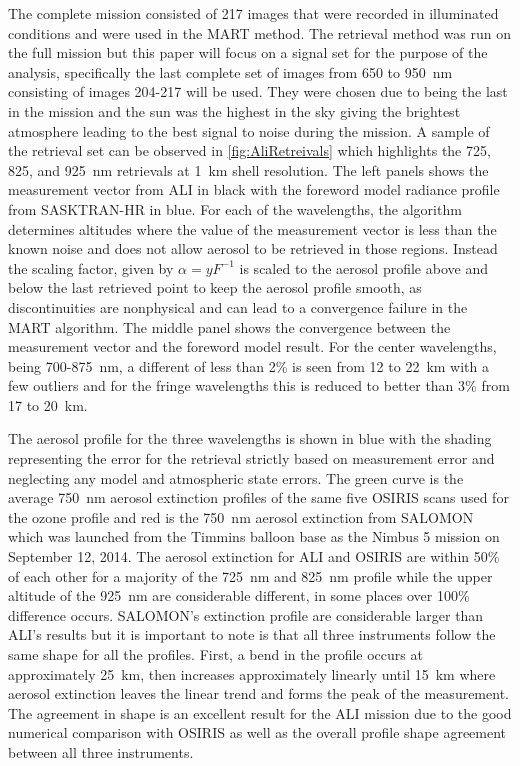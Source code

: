 \documentclass[12pt]{article}
\begin{document}
The complete mission consisted of 217 images that were recorded in illuminated conditions and were used in the MART method. The retrieval method was run on the full mission but this paper will focus on a signal set for the purpose of the analysis, specifically the last complete set of images from 650 to 950~nm consisting of images 204-217 will be used. They were chosen due to being the last in the mission and the sun was the highest in the sky giving the brightest atmosphere leading to the best signal to noise during the mission. A sample of the retrieval set can be observed in \autoref{fig:AliRetreivals} which highlights the 725, 825, and 925~nm retrievals at 1~km shell resolution. The left panels shows the measurement vector from ALI in black with the foreword model radiance profile from SASKTRAN-HR in blue. For each of the wavelengths, the algorithm determines altitudes where the value of the measurement vector is less than the known noise and does not allow aerosol to be retrieved in those regions. Instead the scaling factor, given by $\alpha = yF^{-1}$ is scaled to the aerosol profile above and below the last retrieved point to keep the aerosol profile smooth, as discontinuities are nonphysical and can lead to a convergence failure in the MART algorithm. The middle panel shows the convergence between the measurement vector and the foreword model result. For the center wavelengths, being 700-875~nm, a different of less than 2\% is seen from 12 to 22~km with a few outliers and for the fringe wavelengths this is reduced to better than 3\% from 17 to 20~km.

The aerosol profile for the three wavelengths is shown in blue with the shading representing the error for the retrieval strictly based on measurement error and neglecting any model and atmospheric state errors. The green curve is the average 750~nm aerosol extinction profiles of the same five OSIRIS scans used for the ozone profile and red is the 750~nm aerosol extinction from SALOMON \citep{Berthet2002} which was launched from the Timmins balloon base as the Nimbus 5 mission on September 12, 2014. The aerosol extinction for ALI and OSIRIS are within 50\% of each other for a majority of the 725~nm and 825~nm profile while the upper altitude of the 925~nm are considerable different, in some places over 100\% difference occurs. SALOMON's extinction profile are considerable larger than ALI's results but it is important to note is that all three instruments follow the same shape for all the profiles. First, a bend in the profile occurs at approximately 25~km, then increases approximately linearly until 15~km where aerosol extinction leaves the linear trend and forms the peak of the measurement. The agreement in shape is an excellent result for the ALI mission due to the good numerical comparison with OSIRIS as well as the overall profile shape agreement between all three instruments.
\end{document}
